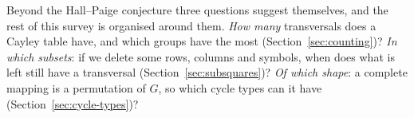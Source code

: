 Beyond the Hall--Paige conjecture three questions suggest themselves, and the rest of this survey is organised around them. \emph{How many} transversals does a Cayley table have, and which groups have the most (Section~\ref{sec:counting})? \emph{In which subsets}: if we delete some rows, columns and symbols, when does what is left still have a transversal (Section~\ref{sec:subsquares})? \emph{Of which shape}: a complete mapping is a permutation of $G$, so which cycle types can it have (Section~\ref{sec:cycle-types})?
